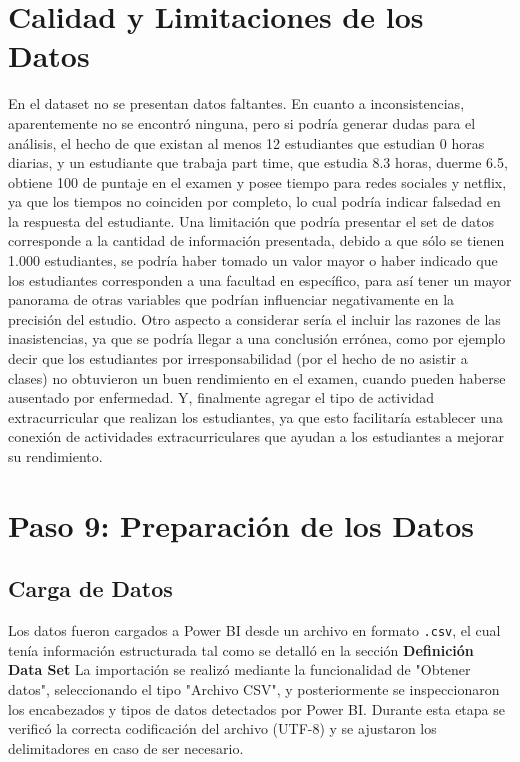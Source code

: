 \documentclass[12pt,letterpaper]{report}
\begin{document}
\section{Calidad y Limitaciones de los Datos}
En el dataset no se presentan datos faltantes. En cuanto a inconsistencias, aparentemente no se encontró ninguna, pero si podría generar dudas para el análisis, el hecho de que existan al menos 12 estudiantes que estudian 0 horas diarias, y un estudiante que trabaja part time, que estudia 8.3 horas, duerme 6.5, obtiene 100 de puntaje en el examen y posee tiempo para redes sociales y netflix, ya que los tiempos no coinciden por completo, lo cual podría indicar falsedad en la respuesta del estudiante.
Una limitación que podría presentar el set de datos corresponde a la cantidad de información presentada, debido a que sólo se tienen 1.000 estudiantes, se podría haber tomado un valor mayor o haber indicado que los estudiantes corresponden a una facultad en específico, para así tener un mayor panorama de otras variables que podrían influenciar negativamente en la precisión del estudio. Otro aspecto a considerar sería el incluir las razones de las inasistencias, ya que se podría llegar a una conclusión errónea, como por ejemplo decir que los estudiantes por irresponsabilidad (por el hecho de no asistir a clases) no obtuvieron un buen rendimiento en el examen, cuando pueden haberse ausentado por enfermedad. Y,
finalmente agregar el tipo de actividad extracurricular que realizan los estudiantes, ya que esto facilitaría establecer una conexión de actividades extracurriculares que ayudan a los estudiantes a mejorar su rendimiento.

\section{Paso 9: Preparación de los Datos}

\subsection{Carga de Datos}
Los datos fueron cargados a Power BI desde un archivo en formato \texttt{.csv}, el cual tenía información estructurada tal como se detalló en la sección \textbf{Definición Data Set} La importación se realizó mediante la funcionalidad de "Obtener datos", seleccionando el tipo "Archivo CSV", y posteriormente se inspeccionaron los encabezados y tipos de datos detectados por Power BI. Durante esta etapa se verificó la correcta codificación del archivo (UTF-8) y se ajustaron los delimitadores en caso de ser necesario.
\end{document}
